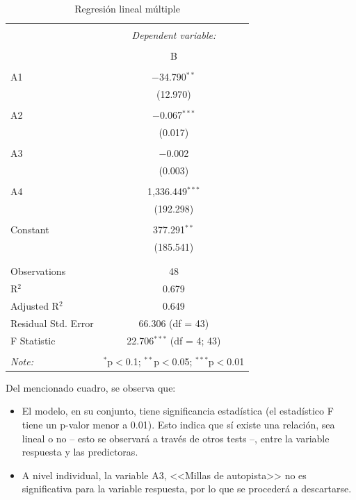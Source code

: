 \documentclass[a4paper,10pt]{article}\usepackage[]{graphicx}\usepackage[]{color}
\begin{document}
\begin{table}[!htbp] \centering 
  \caption{Regresión lineal múltiple} 
  \label{} 
\begin{tabular}{@{\extracolsep{5pt}}lc} 
\\[-1.8ex]\hline 
\hline \\[-1.8ex] 
 & \multicolumn{1}{c}{\textit{Dependent variable:}} \\ 
\cline{2-2} 
\\[-1.8ex] & B \\ 
\hline \\[-1.8ex] 
 A1 & $-$34.790$^{**}$ \\ 
  & (12.970) \\ 
  & \\ 
 A2 & $-$0.067$^{***}$ \\ 
  & (0.017) \\ 
  & \\ 
 A3 & $-$0.002 \\ 
  & (0.003) \\ 
  & \\ 
 A4 & 1,336.449$^{***}$ \\ 
  & (192.298) \\ 
  & \\ 
 Constant & 377.291$^{**}$ \\ 
  & (185.541) \\ 
  & \\ 
\hline \\[-1.8ex] 
Observations & 48 \\ 
R$^{2}$ & 0.679 \\ 
Adjusted R$^{2}$ & 0.649 \\ 
Residual Std. Error & 66.306 (df = 43) \\ 
F Statistic & 22.706$^{***}$ (df = 4; 43) \\ 
\hline 
\hline \\[-1.8ex] 
\textit{Note:}  & \multicolumn{1}{r}{$^{*}$p$<$0.1; $^{**}$p$<$0.05; $^{***}$p$<$0.01} \\ 
\end{tabular} 
\end{table} 


Del mencionado cuadro, se observa que:
\begin{itemize}
  \item El modelo, en su conjunto, tiene significancia estadística (el estadístico F tiene un p-valor menor a 0.01). Esto indica que sí existe una relación, sea lineal o no -- esto se observará a través de otros tests --, entre la variable respuesta y las predictoras.
  \item A nivel individual, la variable A3, <<Millas de autopista>> no es significativa para la variable respuesta, por lo que se procederá a descartarse.
\end{itemize}
\end{document}
